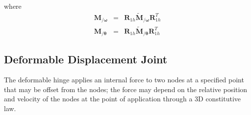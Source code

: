 \documentclass[10pt,dvips]{report}
\newcommand{\T}[1]{\boldsymbol{#1}}
\begin{document}
where
\begin{eqnarray*}
	\T{M}_{/\T{\omega}} & = & \T{R}_{1h} \tilde{\T{M}}_{/\T{\omega}} \T{R}_{1h}^T \\
	\T{M}_{/\T{\theta}} & = & \T{R}_{1h} \tilde{\T{M}}_{/\T{\theta}} \T{R}_{1h}^T
\end{eqnarray*}







\subsection{Deformable Displacement Joint}
The deformable hinge applies an internal force to two nodes at a specified 
point that may be offset from the nodes; the force may depend on the relative
position and velocity of the nodes at the point of application
through a 3D constitutive law.
\end{document}
